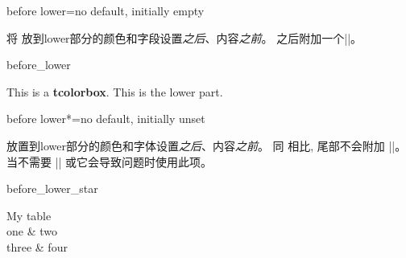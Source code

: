 \begin{docTcbKey}{before lower}{=}{no default, initially empty}

将  放到lower部分的颜色和字段设置\emph{之后}、内容\emph{之前}。
 之后附加一个|\ignorespaces|。
\begin{exdispExample}{before_lower}

\begin{tcolorbox}
This is a \textbf{tcolorbox}.
\tcblower
This is the lower part.
\end{tcolorbox}
\end{exdispExample}
\end{docTcbKey}


\begin{docTcbKey}[][doc new=2019-02-26]{before lower*}{=}{no default, initially unset}

 放置到lower部分的颜色和字体设置\emph{之后}、内容\emph{之前}。
同  相比, 尾部不会附加 |\ignorespaces|。
当不需要 |\ignorespaces| 或它会导致问题时使用此项。
\begin{exdispExample}{before_lower_star}
\begin{tcolorbox}[size=small,bicolor,sidebyside,center lower,
  colback=yellow!30,colbacklower=yellow!20,colframe=yellow!80!black,
  before lower*=\begin{tabular}{cc},
  after lower*=\end{tabular},
]
My table
\tcblower
  \\
  one & two \\
  three & four\\
\end{tcolorbox}
\end{exdispExample}
\end{docTcbKey}







